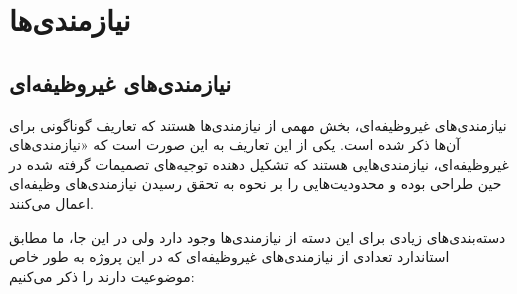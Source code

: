 \chapter{نیازمندی‌ها}





\section{نیاز‌مندی‌های غیروظیفه‌ای}

نیازمندی‌های غیروظیفه‌ای، بخش مهمی از نیازمندی‌ها هستند که تعاریف گوناگونی برای آن‌ها ذکر شده است. یکی از این تعاریف به این صورت است که «نیازمندی‌های غیروظیفه‌ای، نیازمندی‌هایی هستند که تشکیل دهنده توجیه‌های تصمیمات گرفته شده در حین طراحی بوده و محدودیت‌هایی را بر نحوه به تحقق رسیدن نیازمندی‌های وظیفه‌ای اعمال می‌کنند.

دسته‌بندی‌های زیادی برای این دسته از نیازمندی‌ها وجود دارد ولی در این جا، ما مطابق استاندارد  تعدادی از نیازمندی‌های غیروظیفه‌ای که در این پروژه به طور خاص موضوعیت دارند را ذکر می‌کنیم:

